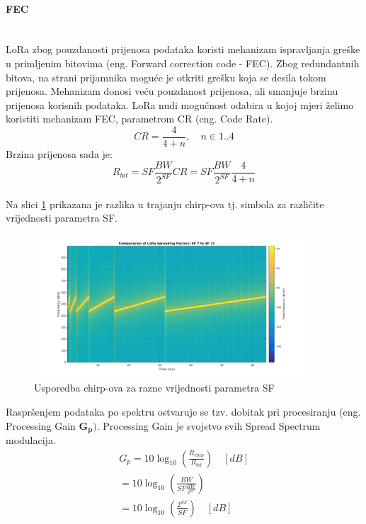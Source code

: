 \paragraph*{FEC}\mbox{}\\ 
\label{paragraph:fec}
LoRa zbog pouzdanosti prijenosa podataka koristi mehanizam ispravljanja greške u primljenim bitovima (eng. Forward correction code - FEC). Zbog redundantnih bitova, na strani prijamnika moguće je otkriti grešku koja se desila tokom prijenosa. Mehanizam donosi veću pouzdanost prijenosa, ali smanjuje brzinu prijenosa korisnih podataka. LoRa nudi mogučnost odabira u kojoj mjeri želimo koristiti mehanizam FEC, parametrom CR (eng. Code Rate).
\begin{equation}
CR = \frac{4}{4 + n} ,\quad n \in 1..4
\end{equation}
Brzina prijenosa sada je:
\begin{equation}
R_{bit} = SF \frac{BW}{2^{SF}} CR = SF \frac{BW}{2^{SF}} \frac{4}{4+n}
\end{equation}
\\
Na slici \ref{img:chirps_comparison_sf} prikazana je razlika u trajanju chirp-ova tj. simbola za različite vrijednosti parametra SF. 
\begin{figure}[ht!]
	\centering
	\includegraphics[width=0.9\textwidth]{images/SF_Comparasion_7_12.png}
	\caption{Usporedba chirp-ova za razne vrijednosti parametra SF}
	\label{img:chirps_comparison_sf}
\end{figure}

\noindent
Raspršenjem podataka po spektru ostvaruje se tzv. dobitak pri procesiranju (eng. Processing Gain $\mathbf{G_{p}})$. Processing Gain je svojstvo svih Spread Spectrum modulacija.
\begin{equation}
\begin{gathered}
G_{p} = 10 \log_{10}(\frac{R_{chip}}{R_{bit}}) \quad[dB]\\
= 10 \log_{10}(\frac{BW}{SF\frac{BW}{2^{SF}}})\\
= 10 \log_{10}(\frac{2^{SF}}{SF}) \quad[dB]
\label{eq:pgain}
\end{gathered}
\end{equation}

